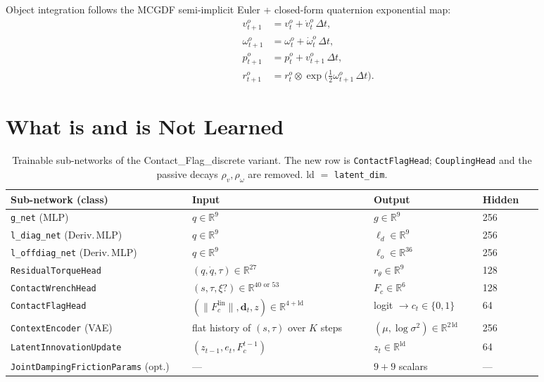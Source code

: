 \documentclass[11pt]{article}
\begin{document}
Object integration follows the MCGDF semi-implicit Euler + closed-form
quaternion exponential map:
\begin{align}
  v^o_{t+1}      &= v^o_t      + \dot v^o_t\,\Delta t, \\
  \omega^o_{t+1} &= \omega^o_t + \dot \omega^o_t\,\Delta t, \\
  p^o_{t+1}      &= p^o_t      + v^o_{t+1}\,\Delta t, \\
  r^o_{t+1}      &= r^o_t \otimes \exp\!\bigl(\tfrac{1}{2}\omega^o_{t+1}\,\Delta t\bigr).
\end{align}

\section{What is and is Not Learned}

\begin{table}[h]
\centering
\small
\begin{tabular}{p{0.30\linewidth} p{0.30\linewidth} p{0.18\linewidth} p{0.10\linewidth}}
\toprule
Sub-network (class)              & Input                                  & Output                       & Hidden \\
\midrule
\texttt{g\_net} (MLP)            & $q \in \mathbb{R}^9$                  & $g \in \mathbb{R}^9$         & 256    \\
\texttt{l\_diag\_net} (Deriv.\,MLP) & $q \in \mathbb{R}^9$              & $\ell_d \in \mathbb{R}^9$    & 256    \\
\texttt{l\_offdiag\_net} (Deriv.\,MLP) & $q \in \mathbb{R}^9$           & $\ell_o \in \mathbb{R}^{36}$ & 256    \\
\texttt{ResidualTorqueHead}      & $(q,\dot q,\tau) \in \mathbb{R}^{27}$ & $r_\theta \in \mathbb{R}^9$  & 128    \\
\texttt{ContactWrenchHead}       & $(s,\tau,\xi?) \in \mathbb{R}^{40\text{ or }53}$ & $F_c \in \mathbb{R}^6$ & 128    \\
\texttt{ContactFlagHead}         & $(\|F_c^{\mathrm{lin}}\|, \mathbf{d}_t, z) \in \mathbb{R}^{4+\mathrm{ld}}$ & logit $\to c_t \in \{0, 1\}$ & 64 \\
\texttt{ContextEncoder} (VAE)    & flat history of $(s,\tau)$ over $K$ steps & $(\mu,\log\sigma^2) \in \mathbb{R}^{2\,\mathrm{ld}}$ & 256 \\
\texttt{LatentInnovationUpdate}  & $(z_{t-1}, e_t, F_c^{t-1})$           & $z_t \in \mathbb{R}^{\mathrm{ld}}$ & 64 \\
\texttt{JointDampingFrictionParams} (opt.) & ---                         & $9+9$ scalars                & ---    \\
\bottomrule
\end{tabular}
\caption{Trainable sub-networks of the
Contact\_Flag\_discrete variant.  The new row is
\texttt{ContactFlagHead}; \texttt{CouplingHead} and the passive
decays $\rho_v, \rho_\omega$ are removed.  ld $=$ \texttt{latent\_dim}.}
\label{tab:cfd-subnets}
\end{table}
\end{document}
